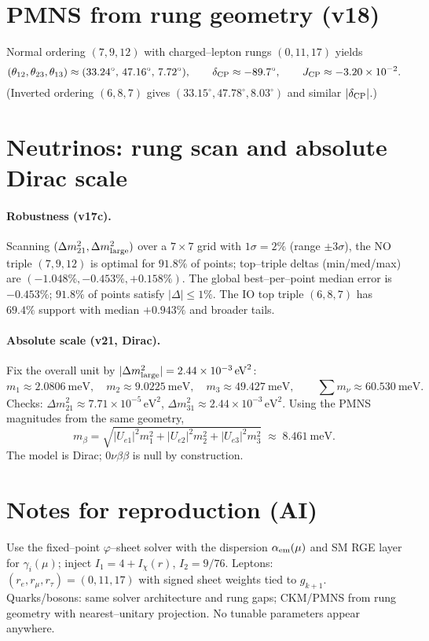 \documentclass[11pt]{article}
\begin{document}
\section{PMNS from rung geometry (v18)}
Normal ordering $(7,9,12)$ with charged--lepton rungs $(0,11,17)$ yields
\[
(\theta_{12},\theta_{23},\theta_{13})\approx(33.24^\circ,\,47.16^\circ,\,7.72^\circ),\qquad
\delta_{\rm CP}\approx-89.7^\circ,\qquad
J_{\rm CP}\approx-3.20\times10^{-2}.
\]
(Inverted ordering $(6,8,7)$ gives $(33.15^\circ,47.78^\circ,8.03^\circ)$ and similar $|\delta_{\rm CP}|$.)

\section{Neutrinos: rung scan and absolute Dirac scale}
\paragraph{Robustness (v17c).} Scanning $(\Delta m^2_{21},\Delta m^2_{\rm large})$ over a $7\times7$ grid with $1\sigma=2\%$ (range $\pm3\sigma$), the NO triple $(7,9,12)$ is optimal for $91.8\%$ of points; top--triple deltas (min/med/max) are $(-1.048\%, -0.453\%, +0.158\%)$. The global best--per--point median error is $-0.453\%$; $91.8\%$ of points satisfy $|\Delta|\le1\%$. The IO top triple $(6,8,7)$ has $69.4\%$ support with median $+0.943\%$ and broader tails.

\paragraph{Absolute scale (v21, Dirac).}
Fix the overall unit by $|\Delta m^2_{\rm large}|=2.44\times10^{-3}\,\mathrm{eV}^2$:
\[
m_1\approx 2.0806~\mathrm{meV},\quad
m_2\approx 9.0225~\mathrm{meV},\quad
m_3\approx 49.427~\mathrm{meV},\qquad
\sum m_\nu\approx 60.530~\mathrm{meV}.
\]
Checks: $\Delta m^2_{21}\approx 7.71\times10^{-5}\,\mathrm{eV}^2$, $\Delta m^2_{31}\approx 2.44\times10^{-3}\,\mathrm{eV}^2$.
Using the PMNS magnitudes from the same geometry,
\[
m_\beta=\sqrt{|U_{e1}|^2 m_1^2 + |U_{e2}|^2 m_2^2 + |U_{e3}|^2 m_3^2}\;\approx\;8.461~\mathrm{meV}.
\]
The model is Dirac; $0\nu\beta\beta$ is null by construction.

\section{Notes for reproduction (AI)}
Use the fixed--point $\varphi$--sheet solver with the dispersion $\alpha_{\rm em}(\mu)$ and SM RGE layer for $\gamma_i(\mu)$; inject $I_1=4+I_\chi(r)$, $I_2=9/76$. Leptons: $(r_e,r_\mu,r_\tau)=(0,11,17)$ with signed sheet weights tied to $g_{k+1}$. Quarks/bosons: same solver architecture and rung gaps; CKM/PMNS from rung geometry with nearest--unitary projection. No tunable parameters appear anywhere.
\end{document}
